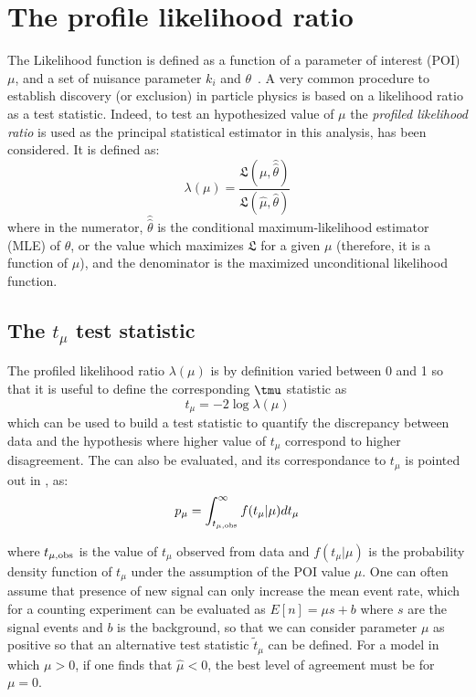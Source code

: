 \section{The profile likelihood ratio}
The Likelihood function is defined as a function of a parameter of interest (POI) $\mu$, and a set of nuisance parameter $k_i$ and $\theta$~\cite{Cowan}.
A very common procedure to establish discovery (or exclusion) in particle physics is based on a likelihood ratio as a test statistic. Indeed, to test an hypothesized value of $\mu$ the \emph{profiled likelihood ratio} is used as the principal statistical estimator in this analysis, has been considered. It is defined as:
\begin{equation}
  \lambda(\mu) = \frac {\mathfrak{L}(\mu,\hat{\hat{\theta}})}{\mathfrak{L(\hat{\mu},\hat{\theta})}}
  \label{eqn:profiled}
\end{equation}
where in the numerator, $\hat{\hat{\theta}}$ is the conditional maximum-likelihood estimator (MLE) of $\theta$, or the value which maximizes $\mathfrak{L}$ for a given $\mu$ (therefore, it is a function of $\mu$), and the denominator is the maximized unconditional likelihood function.

\subsection{The $t_\mu$ test statistic}
The profiled likelihood ratio $\lambda(\mu)$ is by definition varied between 0 and 1 so that it is useful to define the corresponding $\tmu$ statistic as 
\begin{equation}
  t_{\mu} = -2 \log{\lambda(\mu)}
\end{equation}
which can be used to build a test statistic to quantify the discrepancy between data and the hypothesis where higher value of $t_{\mu}$ correspond to higher disagreement. The \p can also be evaluated, and its correspondance to $t_{\mu}$ is pointed out in \Fig{\ref{pvalue}}, as:
\begin{equation}
 p_{\mu}=\int_{t_{\mu,\textup{obs}}}^\infty f(t_\mu \vert \mu) dt_\mu
 \label{eqn:pdatmu}
\end{equation}

where $t_{\mu,\textup{obs}}$ is the value of $t_\mu$ observed from data and $f(t_\mu \vert \mu)$ is the probability density function of $t_\mu$ under the assumption of the POI value $\mu$. One can often assume that presence of new signal can only increase the mean event rate, which for a counting experiment can be evaluated as $E[n] = \mu s + b$ where $s$ are the signal events and $b$ is the background, so that we can consider parameter $\mu$ as positive so that an alternative test statistic $\tilde{t}_\mu$ can be defined. For a model in which $\mu>0$, if one finds that $\hat{\mu}<0$, the best level of agreement must be for $\mu=0$.

